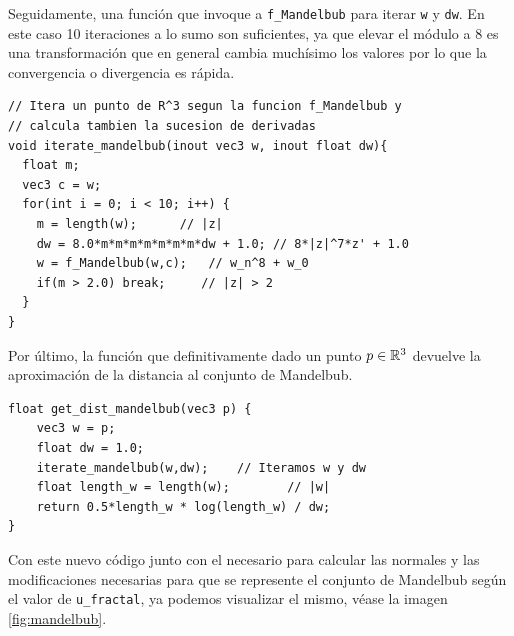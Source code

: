 Seguidamente, una función que invoque a \verb|f_Mandelbub| para iterar \verb|w| y \verb|dw|. En este caso 10 iteraciones a lo sumo son suficientes, ya que elevar el módulo a $8$ es una transformación que en general cambia muchísimo los valores por lo que la convergencia o divergencia es rápida.

\begin{lstlisting}
// Itera un punto de R^3 segun la funcion f_Mandelbub y
// calcula tambien la sucesion de derivadas
void iterate_mandelbub(inout vec3 w, inout float dw){
  float m;
  vec3 c = w;
  for(int i = 0; i < 10; i++) {
    m = length(w);      // |z|
    dw = 8.0*m*m*m*m*m*m*m*dw + 1.0; // 8*|z|^7*z' + 1.0
    w = f_Mandelbub(w,c);   // w_n^8 + w_0
    if(m > 2.0) break;     // |z| > 2
  }
}
\end{lstlisting}

Por último, la función que definitivamente dado un punto $p\in\mathbb{R}^3$ devuelve la aproximación de la distancia al conjunto de Mandelbub. 

\begin{lstlisting}
float get_dist_mandelbub(vec3 p) {
    vec3 w = p;
    float dw = 1.0;
    iterate_mandelbub(w,dw);    // Iteramos w y dw
    float length_w = length(w);        // |w|
    return 0.5*length_w * log(length_w) / dw;
}
\end{lstlisting}

Con este nuevo código junto con el necesario para calcular las normales y las modificaciones necesarias para que se represente el conjunto de Mandelbub según el valor de \verb|u_fractal|, ya podemos visualizar el mismo, véase la imagen \ref{fig:mandelbub}. 

